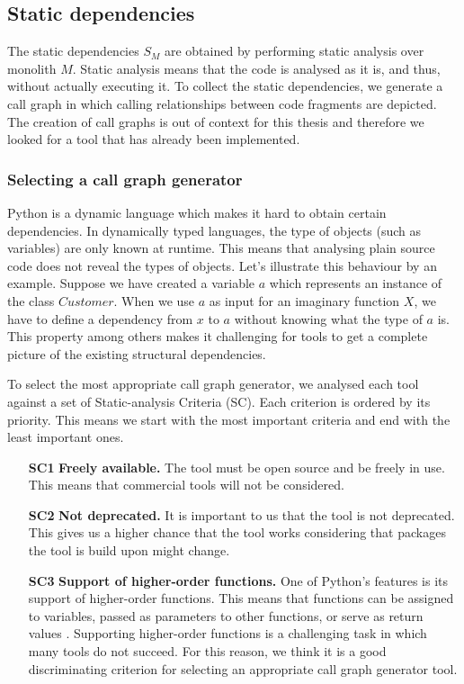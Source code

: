 \subsection{Static dependencies}
The static dependencies $S_M$ are obtained by performing static analysis over monolith $M$. Static analysis means that the code is analysed as it is, and thus, without actually executing it. To collect the static dependencies, we generate a call graph in which calling relationships between code fragments are depicted. The creation of call graphs is out of context for this thesis and therefore we looked for a tool that has already been implemented.

\subsubsection{Selecting a call graph generator}\label{sss:call_graph_generators}
Python is a dynamic language which makes it hard to obtain certain dependencies. In dynamically typed languages, the type of objects (such as variables) are only known at runtime. This means that analysing plain source code does not reveal the types of objects. Let's illustrate this behaviour by an example. Suppose we have created a variable $a$ which represents an instance of the class $Customer$. When we use $a$ as input for an imaginary function $X$, we have to define a dependency from $x$ to $a$ without knowing what the type of $a$ is. This property among others makes it challenging for tools to get a complete picture of the existing structural dependencies. \par

To select the most appropriate call graph generator, we analysed each tool against a set of Static-analysis Criteria (SC). Each criterion is ordered by its priority. This means we start with the most important criteria and end with the least important ones. 

\begin{itemize}
    \item[\textbf{SC1}] \textbf{Freely available.} The tool must be open source and be freely in use. This means that commercial tools will not be considered. 
    \item[\textbf{SC2}] \textbf{Not deprecated.} It is important to us that the tool is not deprecated. This gives us a higher chance that the tool works considering that packages the tool is build upon might change.
    \item[\textbf{SC3}] \textbf{Support of higher-order functions.} One of Python's features is its support of higher-order functions. This means that functions can be assigned to variables, passed as parameters to other functions, or serve as return values \cite{salis15pycg}. Supporting higher-order functions is a challenging task in which many tools do not succeed. For this reason, we think it is a good discriminating criterion for selecting an appropriate call graph generator tool. 
\end{itemize}

